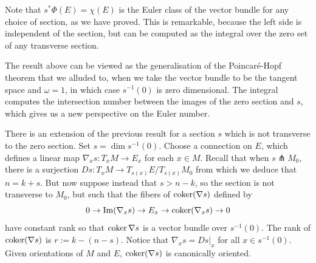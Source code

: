 Note that $s^*\Phi(E) = \chi(E)$ is the Euler class of the vector bundle for any
choice of section, as we have proved. This is remarkable, because the left side
is independent of the section, but can be computed as the integral over the zero
set of any transverse section.

The result above can be viewed as the generalisation of the Poincar\'e-Hopf
theorem that we alluded to, when we take the vector bundle to be the
tangent space and $\omega=1$, in which case $s^{-1}(0)$ is zero dimensional. 
The integral computes the intersection number between the images of the zero
section and $s$, which gives us a new perspective on the Euler number. 

There is an extension of the previous result for a section $s$ which is not
transverse to the zero section. Set $s= \dim s^{-1}(0)$. Choose a connection on
$E$, which defines a linear map $\nabla_x s : T_xM \to E_x$ for each  $x\in M$.
Recall that when $s \pitchfork M_0$, 
there is a surjection $Ds : T_x M \to T_{s(x)} E / T_{s(x)} M_0$ from which 
we deduce that $n = k + s$. 
But now suppose instead that  $s > n - k$, so
the section is not transverse to $M_0$, but such that the fibers of 
$\operatorname{coker} (\nabla s)$ defined by 
\[
0 \to {\operatorname{Im}}(\nabla_x s) \to E_x \to \operatorname{coker} (\nabla_x s) \to 0
\] 
have constant rank so that $\operatorname{coker} \nabla s$ is a vector bundle over  $s^{-1}(0)$.
The rank of $\operatorname{coker} (\nabla s)$ is $r := k-(n-s)$.
Notice that $\nabla_x s = Ds|_x$ for all  $x\in s^{-1}(0)$. 
Given orientations of  $M$ and  $E$, $\operatorname{coker}(\nabla s)$ is canonically oriented.


